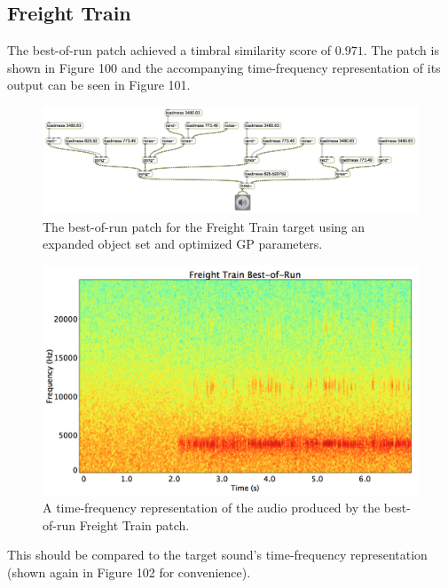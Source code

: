\documentclass[12pt]{report} 	%
\numberwithin{figure}{chapter}
\numberwithin{table}{chapter}
\numberwithin{equation}{chapter}
\begin{document}
\begin{flushleft}
\subsection{Freight Train}
The best-of-run patch achieved a timbral similarity score of $0.971$. The patch is shown in Figure 100 and the accompanying time-frequency representation of its output can be seen in Figure 101.
\begin{figure}[h!]
\begin{center}
\includegraphics[angle=270, scale=0.50]{FreightTrain_Best}
\caption[Freight train best-of-run patch]{The best-of-run patch for the Freight Train target using an expanded object set and optimized GP parameters.}
\end{center}
\end{figure}
\begin{figure}[h!]
\begin{center}
\includegraphics[scale=0.35,width=\linewidth]{FreightTrainBestOfRunSTFT}
\caption[Best-of-run freight train time-frequency representation]{A time-frequency representation of the audio produced by the best-of-run Freight Train patch.}
\end{center}
\end{figure}
This should be compared to the target sound's time-frequency representation (shown again in Figure 102 for convenience).
\begin{figure}[h!]

\end{figure}
\end{flushleft}
\end{document}
